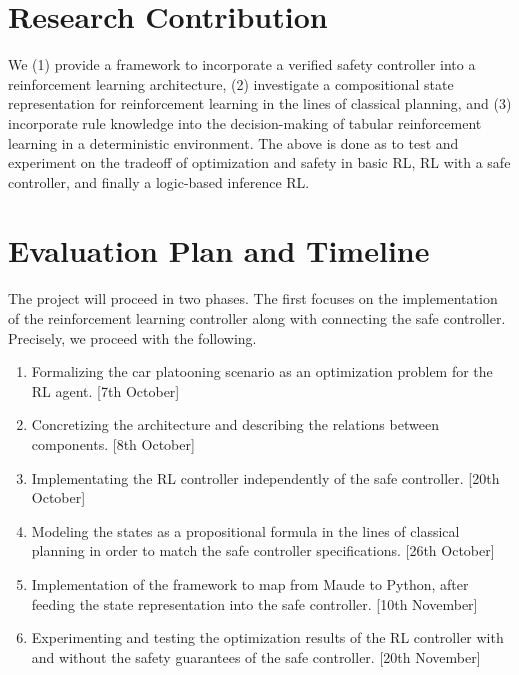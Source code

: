 \documentclass[a4paper,11pt]{article}
\begin{document}
\section{Research Contribution}
We (1) provide a framework to incorporate a verified safety controller into a reinforcement learning architecture, 
(2) investigate a compositional state representation for reinforcement learning in the lines of classical planning, 
and (3) incorporate rule knowledge into the decision-making of tabular reinforcement learning in a deterministic environment. 
The above is done as to test and experiment on the tradeoff of optimization and safety in basic RL, RL with a safe controller, 
and finally a logic-based inference RL.


\section{Evaluation Plan and Timeline}
The project will proceed in two phases. The first focuses on the implementation of the reinforcement learning controller along with 
connecting the safe controller. Precisely, we proceed with the following. 
\begin{enumerate}
  \item Formalizing the car platooning scenario as an optimization problem for the RL agent. [7th October] 
  \item Concretizing the architecture and describing the relations between components. [8th October]
  \item Implementating the RL controller independently of the safe controller. [20th October]
  \item Modeling the states as a propositional formula in the lines of classical planning in order to match the safe controller specifications. [26th October]
  \item Implementation of the framework to map from Maude to Python, after feeding the state representation into the safe controller. [10th November]
  \item Experimenting and testing the optimization results of the RL controller with and without the safety guarantees of the safe controller. [20th November]
\end{enumerate}
\end{document}
